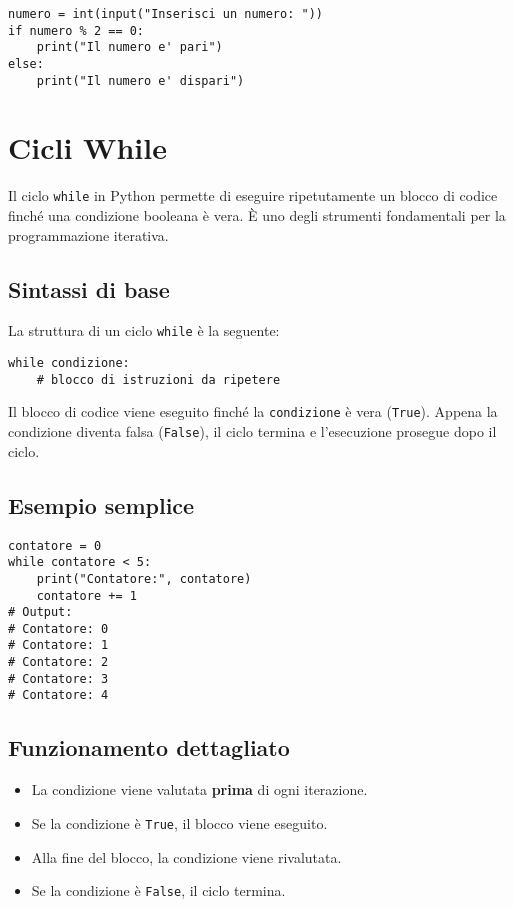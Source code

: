 \documentclass[a4paper,12pt]{article}
\begin{document}
\begin{lstlisting}
numero = int(input("Inserisci un numero: "))
if numero % 2 == 0:
    print("Il numero e' pari")
else:
    print("Il numero e' dispari")
\end{lstlisting}

\begin{center}
\end{center}

\section{Cicli While}
Il ciclo \texttt{while} in Python permette di eseguire ripetutamente un blocco di codice finché una condizione booleana è vera. È uno degli strumenti fondamentali per la programmazione iterativa.

\subsection*{Sintassi di base}
La struttura di un ciclo \texttt{while} è la seguente:
\begin{lstlisting}
while condizione:
    # blocco di istruzioni da ripetere
\end{lstlisting}
Il blocco di codice viene eseguito finché la \texttt{condizione} è vera (\texttt{True}). Appena la condizione diventa falsa (\texttt{False}), il ciclo termina e l'esecuzione prosegue dopo il ciclo.

\subsection*{Esempio semplice}
\begin{lstlisting}
contatore = 0
while contatore < 5:
    print("Contatore:", contatore)
    contatore += 1
# Output:
# Contatore: 0
# Contatore: 1
# Contatore: 2
# Contatore: 3
# Contatore: 4
\end{lstlisting}

\subsection*{Funzionamento dettagliato}
\begin{itemize}
    \item La condizione viene valutata \textbf{prima} di ogni iterazione.
    \item Se la condizione è \texttt{True}, il blocco viene eseguito.
    \item Alla fine del blocco, la condizione viene rivalutata.
    \item Se la condizione è \texttt{False}, il ciclo termina.
\end{itemize}
\end{document}
